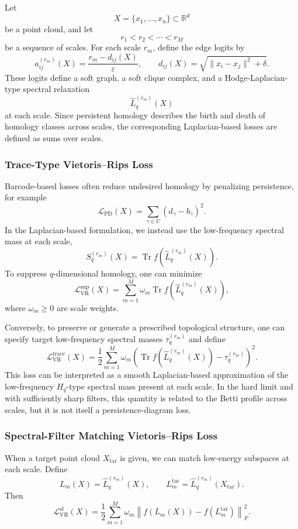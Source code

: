 \documentclass[pdflatex,sn-mathphys-ay]{sn-jnl}%
\theoremstyle{thmstyleone}%
\theoremstyle{thmstyletwo}%
\theoremstyle{thmstylethree}%
\begin{document}
Let
\[
X=\{x_1,\ldots,x_n\}\subset\mathbb{R}^d
\]
be a point cloud, and let
\[
r_1<r_2<\cdots<r_M
\]
be a sequence of scales. For each scale \(r_m\), define the edge logits by
\[
a_{ij}^{(r_m)}(X)
=
\frac{r_m-d_{ij}(X)}{\varepsilon},
\qquad
d_{ij}(X)=\sqrt{\|x_i-x_j\|^2+\delta}.
\]
These logits define a soft graph, a soft clique complex, and a Hodge-Laplacian-type spectral relaxation
\[
\widehat{L}_q^{(r_m)}(X)
\]
at each scale. Since persistent homology describes the birth and death of homology classes across scales, the corresponding Laplacian-based losses are defined as sums over scales.

\subsubsection{Trace-Type Vietoris--Rips Loss}

Barcode-based losses often reduce undesired homology by penalizing persistence, for example
\[
\mathcal{L}_{\mathrm{PD}}(X)
=
\sum_{\gamma\in U}
(d_\gamma-b_\gamma)^2.
\]
In the Laplacian-based formulation, we instead use the low-frequency spectral mass at each scale,
\[
S_q^{(r_m)}(X)
=
\operatorname{Tr}
f
\left(
\widehat{L}_q^{(r_m)}(X)
\right).
\]
To suppress \(q\)-dimensional homology, one can minimize
\[
\mathcal{L}_{\mathrm{VR}}^{\mathrm{sup}}(X)
=
\sum_{m=1}^{M}
\omega_m
\operatorname{Tr}
f
\left(
\widehat{L}_q^{(r_m)}(X)
\right),
\]
where \(\omega_m\ge0\) are scale weights.

Conversely, to preserve or generate a prescribed topological structure, one can specify target low-frequency spectral masses \(\tau_q^{(r_m)}\) and define
\[
\mathcal{L}_{\mathrm{VR}}^{\mathrm{trace}}(X)
=
\frac{1}{2}
\sum_{m=1}^{M}
\omega_m
\left(
\operatorname{Tr}
f
\left(
\widehat{L}_q^{(r_m)}(X)
\right)
-
\tau_q^{(r_m)}
\right)^2.
\]
This loss can be interpreted as a smooth Laplacian-based approximation of the low-frequency \(H_q\)-type spectral mass present at each scale.
In the hard limit and with sufficiently sharp filters, this quantity is related to the Betti profile across scales, but it is not itself a persistence-diagram loss.

\subsubsection{Spectral-Filter Matching Vietoris--Rips Loss}

When a target point cloud \(X_{\mathrm{tar}}\) is given, we can match low-energy subspaces at each scale. Define
\[
L_m(X)=\widehat{L}_q^{(r_m)}(X),
\qquad
L_m^{\mathrm{tar}}=\widehat{L}_q^{(r_m)}(X_{\mathrm{tar}}).
\]
Then
\[
\mathcal{L}_{\mathrm{VR}}^{\mathrm{sf}}(X)
=
\frac{1}{2}
\sum_{m=1}^{M}
\omega_m
\left\|
f(L_m(X))-f(L_m^{\mathrm{tar}})
\right\|_F^2.
\]
\end{document}
